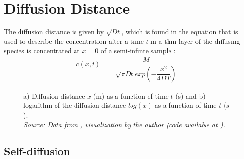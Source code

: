 \clearpage
\section{Diffusion Distance}

The diffusion distance is given by $\sqrt{Dt}$, which is found in the equation that is used to describe the concentration after a time $t$ in a thin layer of the diffusing species is concentrated at $x=0$ of a semi-infinte sample \cite{diff}:
\begin{align}
  \label{eq:3}
  c(x,t)&=\dfrac{M}{\sqrt{\pi D t}exp\left(-\dfrac{x^2}{4DT}\right)}
\end{align}

\begin{figure}[h]
 \centering
 \captionsetup{justification=centering}
 \caption{a) Diffusion distance $x$ (m) as a function of time $t$ (s) and b) logarithm of the diffusion distance $log(x)$ as a function of time $t$ ($s$). \\
 \textit{Source: Data from \citep{kakusan}, visualization by the author (code available at \citep{mygit}).}}
 \label{fig:diffusion}
\end{figure}


\subsection{Self-diffusion}

